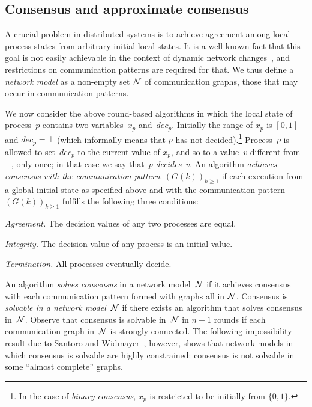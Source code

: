 \documentclass[a4paper]{article}
\theoremstyle{newthm}
\renewcommand{\ge}{\geqslant}
\begin{document}
\subsection{Consensus and approximate consensus}
 
A crucial problem in distributed systems is to achieve agreement among local process states
     from arbitrary initial local states.
It is a well-known fact that this goal is not easily achievable in the context 
	of dynamic network changes~\cite{FLP85,SW89}, and restrictions on communication patterns
	are required for that.
We thus define a {\em network model\/} as a non-empty set ${\cal N}$ of
     communication graphs, those that may occur in communication patterns.

We now consider the above round-based algorithms in which the local state of 
	process~$p$ contains two variables~$x_p$ and~$dec_p$. 
Initially the range of $x_p$ is $[0,1]$
 	and $dec_p = \bot$ (which informally means that $p$
	has not  decided).\footnote{In the case of  {\em binary consensus\/}, $x_p$  is restricted to be initially from $\{0,1\}$.}
Process~$p$ is allowed to set~$dec_p$ to the current value of $x_p$, and so to a value~$v$ different from $\bot$,
	     only once; in that case we say that~$p$ {\em decides}~$v$.	
An algorithm {\em  achieves consensus with the communication pattern}~$(G(k))_{k\ge 1}$ 
	 if each execution from a global initial state as specified above and
             with the communication pattern~$(G(k))_{k\ge 1}$   fulfills the following three conditions:               
	\begin{description}
	  \item{\em Agreement.} The decision values of any two processes are equal.

	  \item{\em Integrity.} The decision value of any process is an initial value.

	  \item{\em Termination.} All processes eventually decide.

	\end{description}
An algorithm {\em  solves consensus\/} in a network
	     model~${\cal N}$ if it achieves consensus with each communication
	     pattern formed with graphs all in ${\cal N}$.
Consensus is {\em solvable in a network model~${\cal N}$\/} if there
     exists an algorithm that solves  consensus in~${\cal N}$.
Observe that consensus is solvable in~${\cal N}$ in $n-1$ rounds if each communication graph 
	in~${\cal N}$ is strongly connected. 
The following impossibility result  due to Santoro and Widmayer~\cite{SW89}, however, shows that network
     models in which consensus is solvable are highly constrained:
     consensus is not solvable in some ``almost complete'' graphs.
     
\end{document}
